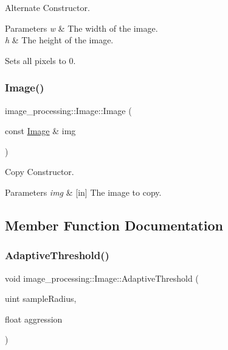 Alternate Constructor. 


\begin{DoxyParams}{Parameters}
{\em w} & The width of the image. \\
\hline
{\em h} & The height of the image.\\
\hline
\end{DoxyParams}
Sets all pixels to 0. \mbox{\label{classimage__processing_1_1Image_ae0a46daf0a6697343674f4fc1d1a1da6}} 
\subsubsection{\texorpdfstring{Image()}{Image()}\hspace{0.1cm}{\footnotesize\ttfamily [3/3]}}
{\footnotesize\ttfamily image\+\_\+processing\+::\+Image\+::\+Image (\begin{DoxyParamCaption}\item[{const \hyperlink{classimage__processing_1_1Image}{Image} \&}]{img }\end{DoxyParamCaption})}



Copy Constructor. 


\begin{DoxyParams}{Parameters}
{\em img} & \mbox{[}in\mbox{]} The image to copy. \\
\hline
\end{DoxyParams}


\subsection{Member Function Documentation}
\mbox{\label{classimage__processing_1_1Image_a7cc53155ea74b8480a0ca8fbfa698a65}} 
\subsubsection{\texorpdfstring{Adaptive\+Threshold()}{AdaptiveThreshold()}}
{\footnotesize\ttfamily void image\+\_\+processing\+::\+Image\+::\+Adaptive\+Threshold (\begin{DoxyParamCaption}\item[{uint}]{sample\+Radius,  }\item[{float}]{aggression }\end{DoxyParamCaption})}



